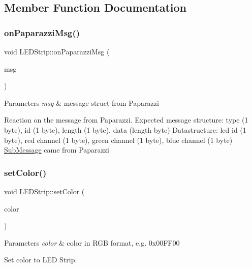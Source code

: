 \subsection{Member Function Documentation}
\mbox{\label{class_l_e_d_strip_af9708cc14c0e3f75e5b3c268b398f436}} 
\subsubsection{\texorpdfstring{on\+Paparazzi\+Msg()}{onPaparazziMsg()}}
{\footnotesize\ttfamily void L\+E\+D\+Strip\+::on\+Paparazzi\+Msg (\begin{DoxyParamCaption}\item[{\hyperlink{struct_sub_message}{Sub\+Message} $\ast$}]{msg }\end{DoxyParamCaption})\hspace{0.3cm}{\ttfamily [virtual]}}


\begin{DoxyParams}{Parameters}
{\em msg} & message struct from Paparazzi\\
\hline
\end{DoxyParams}
Reaction on the message from Paparazzi. Expected message structure\+: type (1 byte), id (1 byte), length (1 byte), data (length byte) Datastructure\+: led id (1 byte), red channel (1 byte), green channel (1 byte), blue channel (1 byte) \hyperlink{struct_sub_message}{Sub\+Message} came from Paparazzi \mbox{\label{class_l_e_d_strip_a310b381acdd83a01ddb6e2debebbbc7c}} 
\subsubsection{\texorpdfstring{set\+Color()}{setColor()}\hspace{0.1cm}{\footnotesize\ttfamily [1/2]}}
{\footnotesize\ttfamily void L\+E\+D\+Strip\+::set\+Color (\begin{DoxyParamCaption}\item[{unsigned int}]{color }\end{DoxyParamCaption})}


\begin{DoxyParams}{Parameters}
{\em color} & color in R\+GB format, e.\+g. 0x00\+F\+F00\\
\hline
\end{DoxyParams}
Set color to L\+ED Strip. \mbox{\label{class_l_e_d_strip_a1f9d9c2784c9ad893163f7f17e603ce7}} 
